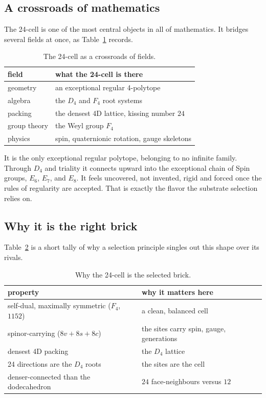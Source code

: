 \subsection{A crossroads of mathematics}

The 24-cell is one of the most central objects in all of mathematics. It bridges several fields at once, as Table~\ref{tab:crossroads} records.

\begin{table}[ht]
\centering
\begin{tabular}{@{}ll@{}}
\toprule
field & what the 24-cell is there \\
\midrule
geometry & an exceptional regular 4-polytope \\
algebra & the $D_4$ and $F_4$ root systems \\
packing & the densest 4D lattice, kissing number $24$ \\
group theory & the Weyl group $F_4$ \\
physics & spin, quaternionic rotation, gauge skeletons \\
\bottomrule
\end{tabular}
\caption{The 24-cell as a crossroads of fields.}
\label{tab:crossroads}
\end{table}

It is the only exceptional regular polytope, belonging to no infinite family. Through $D_4$ and triality it connects upward into the exceptional chain of Spin groups, $E_6$, $E_7$, and $E_8$. It feels uncovered, not invented, rigid and forced once the rules of regularity are accepted. That is exactly the flavor the substrate selection relies on.

\subsection{Why it is the right brick}

Table~\ref{tab:right-brick} is a short tally of why a selection principle singles out this shape over its rivals.

\begin{table}[ht]
\centering
\begin{tabular}{@{}ll@{}}
\toprule
property & why it matters here \\
\midrule
self-dual, maximally symmetric ($F_4$, $1152$) & a clean, balanced cell \\
spinor-carrying ($8v + 8s + 8c$) & the sites carry spin, gauge, generations \\
densest 4D packing & the $D_4$ lattice \\
24 directions are the $D_4$ roots & the sites are the cell \\
denser-connected than the dodecahedron & $24$ face-neighbours versus $12$ \\
\bottomrule
\end{tabular}
\caption{Why the 24-cell is the selected brick.}
\label{tab:right-brick}
\end{table}

